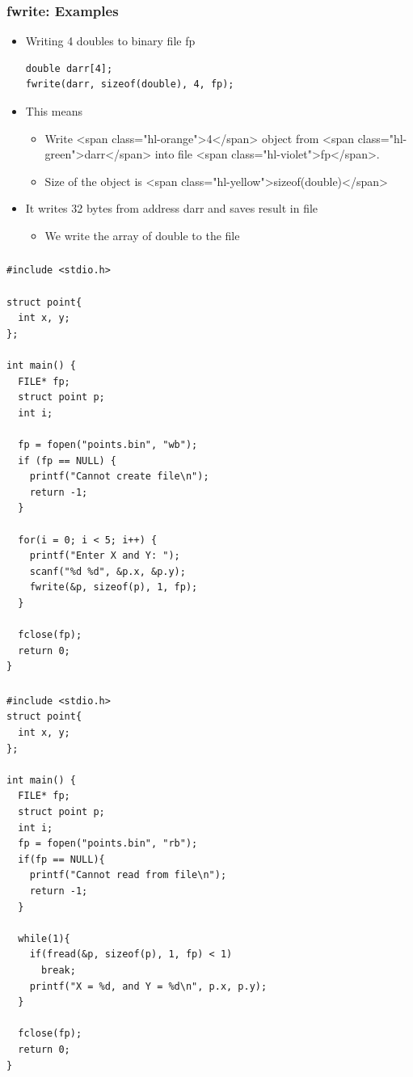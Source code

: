 \documentclass{../c-lecture}
\begin{document}
\begin{frame}[fragile]
  \frametitle{fwrite: Examples}
  \begin{itemize}
    \item Writing 4 doubles to binary file fp
    \begin{verbatim}
double darr[4];
fwrite(darr, sizeof(double), 4, fp);
    \end{verbatim}
    \item This means
    \begin{itemize}
      \item
        Write <span class="hl-orange">4</span> object from
        <span class="hl-green">darr</span> into file
        <span class="hl-violet">fp</span>.

      \item
        Size of the object is <span class="hl-yellow">sizeof(double)</span>

    \end{itemize}
    \item It writes 32 bytes from address darr and saves result in file
    \begin{itemize}
      \item We write the array of double to the file
    \end{itemize}
  \end{itemize}
\end{frame}

\begin{frame}[fragile]
  \frametitle{}
  \begin{verbatim}
#include <stdio.h>

struct point{
  int x, y;
};

int main() {
  FILE* fp;
  struct point p;
  int i;

  fp = fopen("points.bin", "wb");
  if (fp == NULL) {
    printf("Cannot create file\n");
    return -1;
  }

  for(i = 0; i < 5; i++) {
    printf("Enter X and Y: ");
    scanf("%d %d", &p.x, &p.y);
    fwrite(&p, sizeof(p), 1, fp);
  }

  fclose(fp);
  return 0;
}
  \end{verbatim}
\end{frame}

\begin{frame}[fragile]
  \frametitle{}
  \begin{verbatim}
#include <stdio.h>
struct point{
  int x, y;
};

int main() {
  FILE* fp;
  struct point p;
  int i;
  fp = fopen("points.bin", "rb");
  if(fp == NULL){
    printf("Cannot read from file\n");
    return -1;
  }

  while(1){
    if(fread(&p, sizeof(p), 1, fp) < 1)
      break;
    printf("X = %d, and Y = %d\n", p.x, p.y);
  }

  fclose(fp);
  return 0;
}
  \end{verbatim}
\end{frame}
\end{document}
